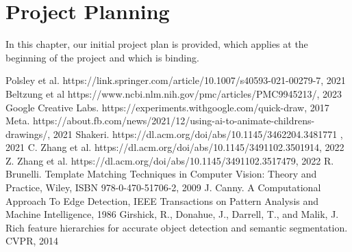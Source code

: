 \documentclass[11pt,a4paper,titlepage,final,table]{article}
\begin{document}
\section{Project Planning}
In this chapter, our initial project plan is provided, which applies at the beginning of the project and which is binding.




\newpage

\begin{thebibliography}{2}
Polsley et al. https://link.springer.com/article/10.1007/s40593-021-00279-7, 2021
Beltzung et al https://www.ncbi.nlm.nih.gov/pmc/articles/PMC9945213/, 2023
Google Creative Labs. https://experiments.withgoogle.com/quick-draw, 2017
Meta. https://about.fb.com/news/2021/12/using-ai-to-animate-childrens-drawings/, 2021
Shakeri. https://dl.acm.org/doi/abs/10.1145/3462204.3481771 , 2021
C. Zhang et al. https://dl.acm.org/doi/abs/10.1145/3491102.3501914, 2022
Z. Zhang et al. https://dl.acm.org/doi/abs/10.1145/3491102.3517479, 2022
R. Brunelli. Template Matching Techniques in Computer Vision: Theory and Practice, Wiley, ISBN 978-0-470-51706-2, 2009
J. Canny. A Computational Approach To Edge Detection, IEEE Transactions on Pattern Analysis and Machine Intelligence, 1986
Girshick, R., Donahue, J., Darrell, T., and Malik, J. Rich feature hierarchies
for accurate object detection and semantic segmentation. CVPR, 2014
\end{thebibliography}
\end{document}
